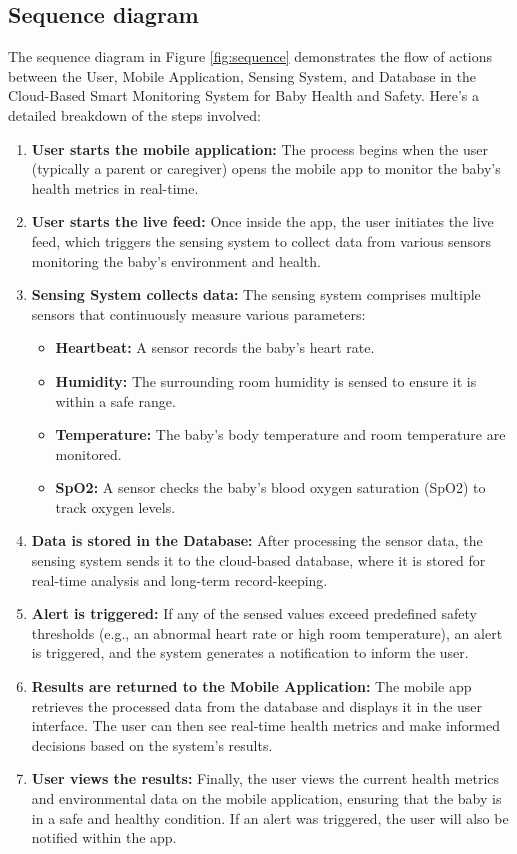 \documentclass[12pt,a4paper]{report}
\begin{document}
\subsection{Sequence diagram}
The sequence diagram in Figure \ref{fig:sequence} demonstrates the flow of actions between the User, Mobile Application, Sensing System, and Database in the Cloud-Based Smart Monitoring System for Baby Health and Safety. Here's a detailed breakdown of the steps involved:
\begin{enumerate}
  \item \textbf{User starts the mobile application:} The process begins when the user (typically a parent or caregiver) opens the mobile app to monitor the baby’s health metrics in real-time.
  \item \textbf{User starts the live feed:} Once inside the app, the user initiates the live feed, which triggers the sensing system to collect data from various sensors monitoring the baby’s environment and health.
  \item \textbf{Sensing System collects data:} The sensing system comprises multiple sensors that continuously measure various parameters:
  \begin{itemize}
    \item  \textbf{Heartbeat:} A sensor records the baby’s heart rate.
    \item \textbf{Humidity:} The surrounding room humidity is sensed to ensure it is within a safe range.
    \item \textbf{Temperature:} The baby’s body temperature and room temperature are monitored.
    \item \textbf{SpO2:} A sensor checks the baby’s blood oxygen saturation (SpO2) to track oxygen levels.
  \end{itemize}
  \item \textbf{Data is stored in the Database:} After processing the sensor data, the sensing system sends it to the cloud-based database, where it is stored for real-time analysis and long-term record-keeping.
  \item \textbf{Alert is triggered:} If any of the sensed values exceed predefined safety thresholds (e.g., an abnormal heart rate or high room temperature), an alert is triggered, and the system generates a notification to inform the user.
  \item \textbf{Results are returned to the Mobile Application:} The mobile app retrieves the processed data from the database and displays it in the user interface. The user can then see real-time health metrics and make informed decisions based on the system's results.
  \item \textbf{User views the results:} Finally, the user views the current health metrics and environmental data on the mobile application, ensuring that the baby is in a safe and healthy condition. If an alert was triggered, the user will also be notified within the app.
\end{enumerate}
\end{document}
